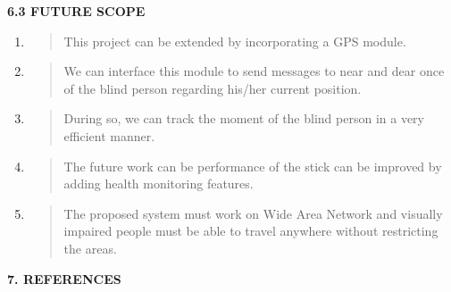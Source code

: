 \documentclass{article}
\begin{document}
\textbf{6.3 FUTURE SCOPE}

\begin{enumerate}
\def\labelenumi{\arabic{enumi}.}
\item
  \begin{quote}
  This project can be extended by incorporating a GPS module.
  \end{quote}
\item
  \begin{quote}
  We can interface this module to send messages to near and dear once of
  the blind person regarding his/her current position.
  \end{quote}
\item
  \begin{quote}
  During so, we can track the moment of the blind person in a very
  efficient manner.
  \end{quote}
\item
  \begin{quote}
  The future work can be performance of the stick can be improved by
  adding health monitoring features.
  \end{quote}
\item
  \begin{quote}
  The proposed system must work on Wide Area Network and visually
  impaired people must be able to travel anywhere without restricting
  the areas.
  \end{quote}
\end{enumerate}

\textbf{7. REFERENCES}
\end{document}
